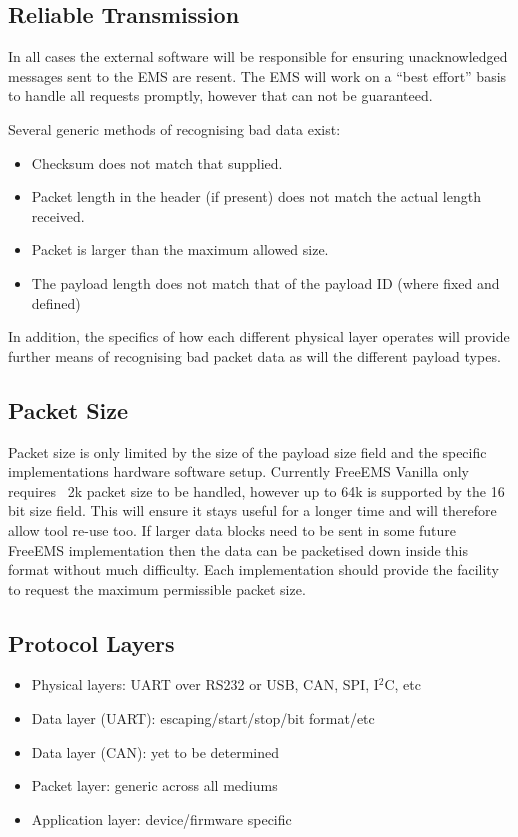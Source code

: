 \documentclass[12pt,a4wide,titlepage]{article}
\begin{document}
\begin{titlepage}
\begin{center}
\subsection{Reliable Transmission}

In all cases the external software will be responsible for ensuring
unacknowledged messages sent to the EMS are resent. The EMS will work on a
``best effort'' basis to handle all requests promptly, however that can not be
guaranteed.

Several generic methods of recognising bad data exist:

\begin{itemize}
\item Checksum does not match that supplied.
\item Packet length in the header (if present) does not match the actual length received.
\item Packet is larger than the maximum allowed size.
\item The payload length does not match that of the payload ID (where fixed and defined)
\end{itemize}

In addition, the specifics of how each different physical layer operates will
provide further means of recognising bad packet data as will the different
payload types.

\subsection{Packet Size}

Packet size is only limited by the size of the payload size field and the
specific implementations hardware software setup. Currently FreeEMS Vanilla
only requires ~2k packet size to be handled, however up to 64k is supported by
the 16 bit size field. This will ensure it stays useful for a longer time and
will therefore allow tool re-use too. If larger data blocks need to be sent in
some future FreeEMS implementation then the data can be packetised down inside
this format without much difficulty. Each implementation should provide the
facility to request the maximum permissible packet size.

\subsection{Protocol Layers}

\begin{itemize}
\item Physical layers: UART over RS232 or USB, CAN, SPI, I$^2$C, etc
\item Data layer (UART): escaping/start/stop/bit format/etc
\item Data layer (CAN): yet to be determined
\item Packet layer: generic across all mediums
\item Application layer: device/firmware specific
\end{itemize}


\end{center}
\end{titlepage}
\end{document}
